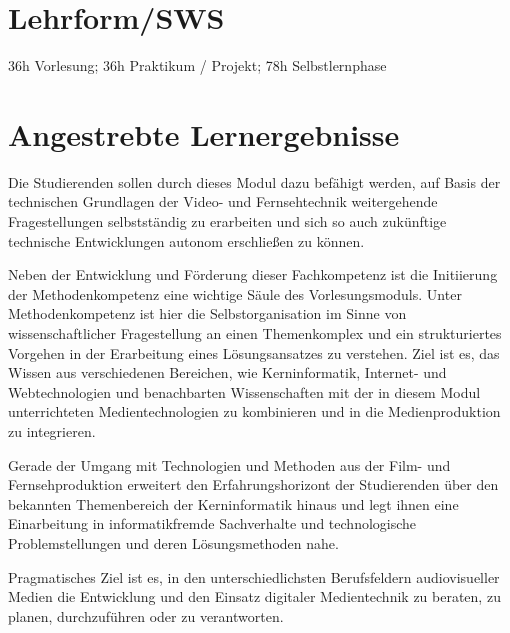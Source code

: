 \hypertarget{lehrformswspathlabelmi-2017modulbeschreibungen-bachelorba_vc-audiovisuelle-medientechnik}{%
\section*{Lehrform/SWS\label{/mi-2017/modulbeschreibungen-bachelor/BA_VC-audiovisuelle-medientechnik}}\label{lehrformswspathlabelmi-2017modulbeschreibungen-bachelorba_vc-audiovisuelle-medientechnik}}

36h Vorlesung; 36h Praktikum / Projekt; 78h Selbstlernphase

\hypertarget{angestrebte-lernergebnissepathlabelmi-2017modulbeschreibungen-bachelorba_vc-audiovisuelle-medientechnik}{%
\section*{Angestrebte
Lernergebnisse\label{/mi-2017/modulbeschreibungen-bachelor/BA_VC-audiovisuelle-medientechnik}}\label{angestrebte-lernergebnissepathlabelmi-2017modulbeschreibungen-bachelorba_vc-audiovisuelle-medientechnik}}

Die Studierenden sollen durch dieses Modul dazu befähigt werden, auf
Basis der technischen Grundlagen der Video- und Fernsehtechnik
weitergehende Fragestellungen selbstständig zu erarbeiten und sich so
auch zukünftige technische Entwicklungen autonom erschließen zu können.

Neben der Entwicklung und Förderung dieser Fachkompetenz ist die
Initiierung der Methodenkompetenz eine wichtige Säule des
Vorlesungsmoduls. Unter Methodenkompetenz ist hier die
Selbstorganisation im Sinne von wissenschaftlicher Fragestellung an
einen Themenkomplex und ein strukturiertes Vorgehen in der Erarbeitung
eines Lösungsansatzes zu verstehen. Ziel ist es, das Wissen aus
verschiedenen Bereichen, wie Kerninformatik, Internet- und
Webtechnologien und benachbarten Wissenschaften mit der in diesem Modul
unterrichteten Medientechnologien zu kombinieren und in die
Medienproduktion zu integrieren.

Gerade der Umgang mit Technologien und Methoden aus der Film- und
Fernsehproduktion erweitert den Erfahrungshorizont der Studierenden über
den bekannten Themenbereich der Kerninformatik hinaus und legt ihnen
eine Einarbeitung in informatikfremde Sachverhalte und technologische
Problemstellungen und deren Lösungsmethoden nahe.

Pragmatisches Ziel ist es, in den unterschiedlichsten Berufsfeldern
audiovisueller Medien die Entwicklung und den Einsatz digitaler
Medientechnik zu beraten, zu planen, durchzuführen oder zu verantworten.

